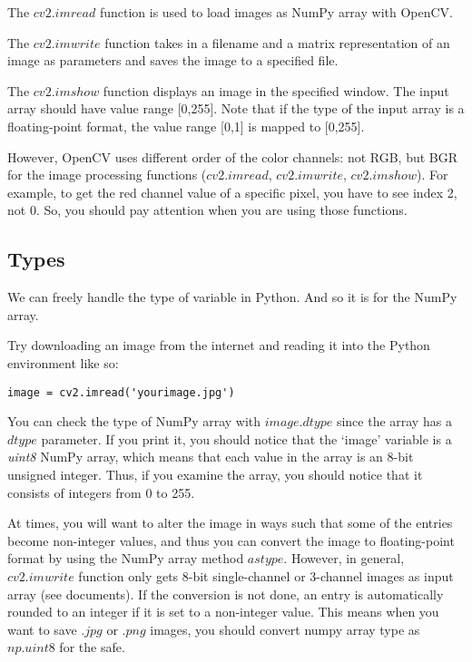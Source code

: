 \documentclass{article}
\begin{document}
The \href{https://docs.opencv.org/4.5.2/d4/da8/group__imgcodecs.html#ga288b8b3da0892bd651fce07b3bbd3a56}{$cv2.imread$} function is used to load images as NumPy array with OpenCV.

The \href{https://docs.opencv.org/4.5.2/d4/da8/group__imgcodecs.html#gabbc7ef1aa2edfaa87772f1202d67e0ce}{$cv2.imwrite$} function takes in a filename and a matrix representation of an image as parameters and saves the image to a specified file.

The \href{https://docs.opencv.org/4.5.0/d7/dfc/group__highgui.html#ga453d42fe4cb60e5723281a89973ee563}{$cv2.imshow$} function displays an image in the specified window. The input array should have value range [0,255]. Note that if the type of the input array is a floating-point format, the value range [0,1] is mapped to [0,255].

However, OpenCV uses different order of the color channels: not RGB, but BGR for the image processing functions ({$cv2.imread$}, {$cv2.imwrite$}, {$cv2.imshow$}). For example, to get the red channel value of a specific pixel, you have to see index 2, not 0. So, you should pay attention when you are using those functions.

\subsection{Types}
We can freely handle the type of variable in Python. And so it is for the NumPy array.

Try downloading an image from the internet and reading it into the Python environment like so:
\begin{lstlisting}
image = cv2.imread('yourimage.jpg')
\end{lstlisting}

You can check the type of NumPy array with {$image.dtype$} since the array has a {$dtype$} parameter. If you print it, you should notice that the `image' variable is a \emph{uint8} NumPy array, which means that each value in the array is an 8-bit unsigned integer. Thus, if you examine the array, you should notice that it consists of integers from 0 to 255.

At times, you will want to alter the image in ways such that some of the entries become non-integer values, and thus you can convert the image to floating-point format by using the NumPy array method \href{https://numpy.org/doc/stable/reference/generated/numpy.ndarray.astype.html}{$astype$}. However, in general, {$cv2.imwrite$} function only gets 8-bit single-channel or 3-channel images as input array (see documents). If the conversion is not done, an entry is automatically rounded to an integer if it is set to a non-integer value. This means when you want to save {$.jpg$} or {$.png$} images, you should convert numpy array type as {$np.uint8$} for the safe.
\end{document}
